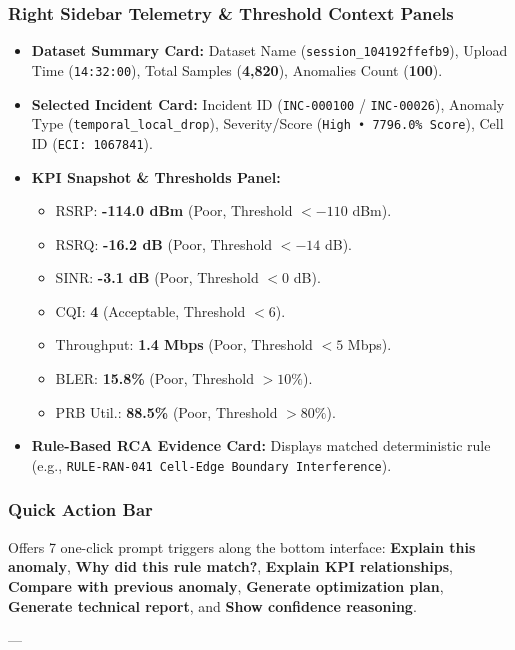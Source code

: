 \documentclass[12pt,a4paper]{article}
\begin{document}
\subsubsection{Right Sidebar Telemetry \& Threshold Context Panels}
\begin{itemize}
    \item \textbf{Dataset Summary Card:} Dataset Name (\texttt{session\_104192ffefb9}), Upload Time (\texttt{14:32:00}), Total Samples (\textbf{4,820}), Anomalies Count (\textbf{100}).
    \item \textbf{Selected Incident Card:} Incident ID (\texttt{INC-000100} / \texttt{INC-00026}), Anomaly Type (\texttt{temporal\_local\_drop}), Severity/Score (\texttt{High • 7796.0\% Score}), Cell ID (\texttt{ECI: 1067841}).
    \item \textbf{KPI Snapshot \& Thresholds Panel:}
    \begin{itemize}
        \item RSRP: \textbf{-114.0 dBm} (Poor, Threshold $< -110$ dBm).
        \item RSRQ: \textbf{-16.2 dB} (Poor, Threshold $< -14$ dB).
        \item SINR: \textbf{-3.1 dB} (Poor, Threshold $< 0$ dB).
        \item CQI: \textbf{4} (Acceptable, Threshold $< 6$).
        \item Throughput: \textbf{1.4 Mbps} (Poor, Threshold $< 5$ Mbps).
        \item BLER: \textbf{15.8\%} (Poor, Threshold $> 10\%$).
        \item PRB Util.: \textbf{88.5\%} (Poor, Threshold $> 80\%$).
    \end{itemize}
    \item \textbf{Rule-Based RCA Evidence Card:} Displays matched deterministic rule (e.g., \texttt{RULE-RAN-041 Cell-Edge Boundary Interference}).
\end{itemize}

\subsubsection{Quick Action Bar}
Offers 7 one-click prompt triggers along the bottom interface: \textbf{Explain this anomaly}, \textbf{Why did this rule match?}, \textbf{Explain KPI relationships}, \textbf{Compare with previous anomaly}, \textbf{Generate optimization plan}, \textbf{Generate technical report}, and \textbf{Show confidence reasoning}.

---
\end{document}
